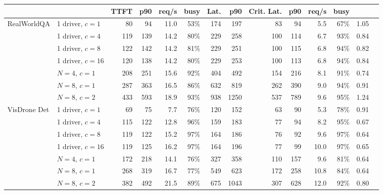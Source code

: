 \begin{table}[t]
\begin{center}
\begin{small}
\begin{sc}
{\begin{tabular}{llrrrrrrrrrrrr}
\cmidrule(lr){3-6} \cmidrule(lr){7-12}
& & TTFT & p90 & req/s & busy & Lat. & p90 & Crit. Lat. & p90 & req/s & busy & \\
\midrule
\multirow{7}{*}{RealWorldQA}
& 1 driver, $c{=}1$ & 80 & 94 & 11.0 & 53\% & 174 & 197 & 83 & 94 & 5.5 & 67\% & 1.05 \\
& 1 driver, $c{=}4$ & 119 & 139 & 14.2 & 80\% & 229 & 258 & 100 & 114 & 6.7 & 93\% & 0.84 \\
& 1 driver, $c{=}8$ & 122 & 142 & 14.2 & 81\% & 229 & 251 & 100 & 115 & 6.8 & 94\% & 0.82 \\
& 1 driver, $c{=}16$ & 120 & 138 & 14.2 & 80\% & 229 & 253 & 100 & 113 & 6.8 & 94\% & 0.84 \\
& $N{=}4$, $c{=}1$ & 208 & 251 & 15.6 & 92\% & 404 & 492 & 154 & 216 & 8.1 & 91\% & 0.74 \\
& $N{=}8$, $c{=}1$ & 287 & 363 & 16.5 & 86\% & 632 & 819 & 262 & 390 & 9.0 & 94\% & 0.91 \\
& $N{=}8$, $c{=}2$ & 433 & 593 & 18.9 & 93\% & 938 & 1250 & 537 & 789 & 9.6 & 95\% & 1.24 \\
\midrule
\multirow{7}{*}{VisDrone Det}
& 1 driver, $c{=}1$ & 69 & 75 & 7.7 & 76\% & 120 & 152 & 63 & 90 & 5.3 & 78\% & 0.91 \\
& 1 driver, $c{=}4$ & 115 & 122 & 12.8 & 96\% & 159 & 183 & 77 & 94 & 8.2 & 95\% & 0.67 \\
& 1 driver, $c{=}8$ & 119 & 122 & 15.2 & 97\% & 164 & 186 & 76 & 92 & 9.6 & 97\% & 0.64 \\
& 1 driver, $c{=}16$ & 119 & 125 & 16.2 & 97\% & 164 & 196 & 77 & 99 & 10.0 & 97\% & 0.65 \\
& $N{=}4$, $c{=}1$ & 172 & 218 & 14.1 & 76\% & 327 & 358 & 110 & 157 & 9.6 & 81\% & 0.64 \\
& $N{=}8$, $c{=}1$ & 268 & 319 & 16.7 & 77\% & 549 & 623 & 172 & 258 & 10.8 & 84\% & 0.64 \\
& $N{=}8$, $c{=}2$ & 382 & 492 & 21.5 & 89\% & 675 & 1043 & 307 & 628 & 12.0 & 92\% & 0.80 \\
\bottomrule
\end{tabular}}
\end{sc}\end{small}\end{center}
\vspace{-0.22in}
\end{table}
